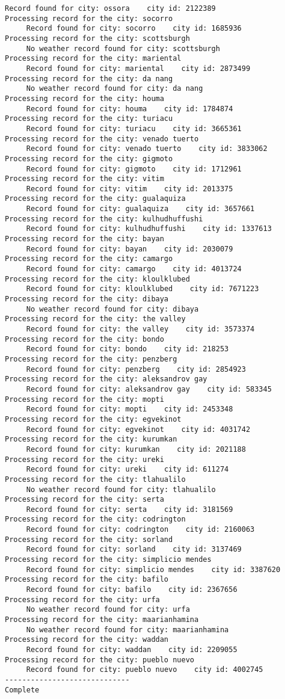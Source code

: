 \documentclass[11pt]{article}
\begin{document}
\begin{Verbatim}[commandchars=\\\{\}]
     Record found for city: ossora    city id: 2122389
Processing record for the city: socorro
     Record found for city: socorro    city id: 1685936
Processing record for the city: scottsburgh
     No weather record found for city: scottsburgh
Processing record for the city: mariental
     Record found for city: mariental    city id: 2873499
Processing record for the city: da nang
     No weather record found for city: da nang
Processing record for the city: houma
     Record found for city: houma    city id: 1784874
Processing record for the city: turiacu
     Record found for city: turiacu    city id: 3665361
Processing record for the city: venado tuerto
     Record found for city: venado tuerto    city id: 3833062
Processing record for the city: gigmoto
     Record found for city: gigmoto    city id: 1712961
Processing record for the city: vitim
     Record found for city: vitim    city id: 2013375
Processing record for the city: gualaquiza
     Record found for city: gualaquiza    city id: 3657661
Processing record for the city: kulhudhuffushi
     Record found for city: kulhudhuffushi    city id: 1337613
Processing record for the city: bayan
     Record found for city: bayan    city id: 2030079
Processing record for the city: camargo
     Record found for city: camargo    city id: 4013724
Processing record for the city: kloulklubed
     Record found for city: kloulklubed    city id: 7671223
Processing record for the city: dibaya
     No weather record found for city: dibaya
Processing record for the city: the valley
     Record found for city: the valley    city id: 3573374
Processing record for the city: bondo
     Record found for city: bondo    city id: 218253
Processing record for the city: penzberg
     Record found for city: penzberg    city id: 2854923
Processing record for the city: aleksandrov gay
     Record found for city: aleksandrov gay    city id: 583345
Processing record for the city: mopti
     Record found for city: mopti    city id: 2453348
Processing record for the city: egvekinot
     Record found for city: egvekinot    city id: 4031742
Processing record for the city: kurumkan
     Record found for city: kurumkan    city id: 2021188
Processing record for the city: ureki
     Record found for city: ureki    city id: 611274
Processing record for the city: tlahualilo
     No weather record found for city: tlahualilo
Processing record for the city: serta
     Record found for city: serta    city id: 3181569
Processing record for the city: codrington
     Record found for city: codrington    city id: 2160063
Processing record for the city: sorland
     Record found for city: sorland    city id: 3137469
Processing record for the city: simplicio mendes
     Record found for city: simplicio mendes    city id: 3387620
Processing record for the city: bafilo
     Record found for city: bafilo    city id: 2367656
Processing record for the city: urfa
     No weather record found for city: urfa
Processing record for the city: maarianhamina
     No weather record found for city: maarianhamina
Processing record for the city: waddan
     Record found for city: waddan    city id: 2209055
Processing record for the city: pueblo nuevo
     Record found for city: pueblo nuevo    city id: 4002745
-----------------------------
Complete


\end{Verbatim}
\end{document}
